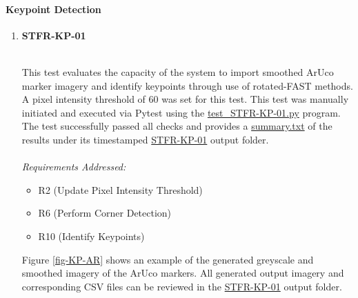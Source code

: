\documentclass[12pt, titlepage]{article}
\begin{document}
\paragraph{Keypoint Detection}
\begin{enumerate}

\item \hypertarget{STFR-KP-01}{\textbf{STFR-KP-01}}\\
This test evaluates the capacity of the system to import smoothed ArUco marker imagery and identify keypoints through use of rotated-FAST methods. A pixel intensity threshold of 60 was set for this test. This test was manually initiated and executed via Pytest using the \href{https://github.com/KiranSingh15/CAS-741-Image-Correspondences/blob/main/src/tests/test_STFR-KP-01.py}{test\_STFR-KP-01.py} program. The test successfully passed all checks and provides a \href{https://github.com/KiranSingh15/CAS-741-Image-Correspondences/blob/main/src/tests/Outputs/2025-04-13_12-20-06/summary.txt}{summary.txt} of the results under its timestamped \href{https://github.com/KiranSingh15/CAS-741-Image-Correspondences/tree/main/src/tests/Outputs/2025-04-13_12-20-06}{STFR-KP-01} output folder. \\ \\
\textit{Requirements Addressed:} 
\begin{itemize}
\item R2 (Update Pixel Intensity Threshold)
\item R6 (Perform Corner Detection)
\item R10 (Identify Keypoints)
\end{itemize}

Figure \ref{fig-KP-AR} shows an example of the generated greyscale and smoothed imagery of the ArUco markers. All generated output imagery and corresponding CSV files can be reviewed in the \href{https://github.com/KiranSingh15/CAS-741-Image-Correspondences/tree/main/src/tests/Outputs/2025-04-13_12-19-08}{STFR-KP-01} output folder.\\


\end{enumerate}
\end{document}
